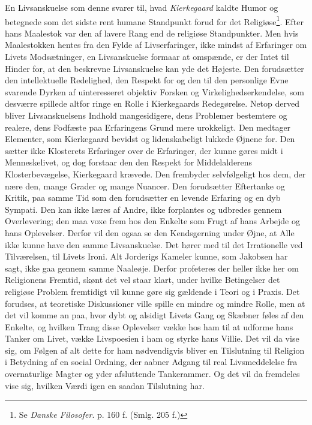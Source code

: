 \documentclass[12pt,a4paper]{book}
\newcommand{\apage}[1]{\marginnote{\footnotesize\textit{[#1]}}}
\begin{document}
En Livsanskuelse som denne svarer til, hvad \emph{Kierkegaard} kaldte Humor og betegnede
som det sidste rent humane Standpunkt forud for det Religiøse\footnote{Se \emph{Danske
Filosofer}. p. 160 f. (Smlg. 205 f.)}. Efter hans Maalestok var den af lavere Rang end de
religiøse Standpunkter. Men hvis Maalestokken hentes fra den Fylde af Livserfaringer, ikke
mindst af Erfaringer om Livets Modsætninger, en Livsanskuelse formaar at omspænde, er der
Intet til Hinder for, at den beskrevne Livsanskuelse kan yde det Højeste. Den forudsætter den
intellektuelle Redelighed, den Respekt for og den til den personlige Evne svarende Dyrken
af uinteresseret objektiv Forsken og Virkelighedserkendelse, som desværre spillede altfor
ringe en Rolle i Kierkegaards Redegørelse. Netop derved bliver Livsanskuelsens Indhold
mangesidigere, dens Problemer bestemtere og realere, dens Fodfæste paa Erfaringens Grund mere
urokkeligt. Den medtager Elementer, som Kierkegaard bevidst og lidenskabeligt lukkede Øjnene
for. Den sætter ikke Klosterets Erfaringer over de Erfaringer, der kunne gøres midt i
Menneskelivet, og dog forstaar den den Respekt for Middelalderens Klosterbevægelse,
Kierkegaard krævede. Den \apage{379} frembyder selvfølgeligt hos dem, der nære den, mange Grader og mange
Nuancer. Den forudsætter Eftertanke og Kritik, paa samme Tid som den forudsætter en levende
Erfaring og en dyb Sympati. Den kan ikke læres af Andre, ikke forplantes og udbredes gennem
Overlevering; den maa voxe frem hos den Enkelte som Frugt af hans Arbejde og hans Oplevelser.
Derfor vil den ogsaa se den Kendsgerning under Øjne, at Alle ikke kunne have den samme
Livsanskuelse. Det hører med til det Irrationelle ved Tilværelsen, til Livets Ironi. Alt
Jorderigs Kameler kunne, som Jakobsen har sagt, ikke gaa gennem samme Naaleøje. Derfor
profeteres der heller ikke her om Religionens Fremtid, skønt det vel staar klart, under hvilke
Betingelser det religiøse Problem fremtidigt vil kunne gøre sig gældende i Teori og i Praxis.
Det forudses, at teoretiske Diskussioner ville spille en mindre og mindre Rolle, men at det
vil komme an paa, hvor dybt og alsidigt Livets Gang og Skæbner føles af den Enkelte, og
hvilken Trang disse Oplevelser vække hos ham til at udforme hans Tanker om Livet, vække
Livspoesien i ham og styrke hans Villie. Det vil da vise sig, om Følgen af alt dette for ham
nødvendigvis bliver en Tilslutning til Religion i Betydning af en social Ordning, der aabner
Adgang til real Livsmeddelelse fra overnaturlige Magter og yder afsluttende Tankerammer. Og
det vil da fremdeles vise sig, hvilken Værdi igen en saadan Tilslutning har.
\end{document}
